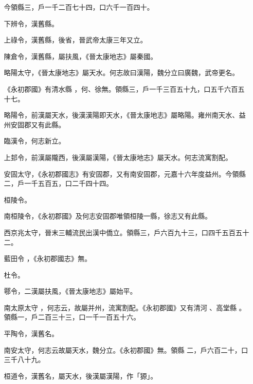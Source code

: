 \begin{pinyinscope}
 今領縣三，戶一千二百七十四，口六千一百四十。



 下辨令，漢舊縣。



 上祿令，漢舊縣，後省，晉武帝太康三年又立。



 陳倉令，漢舊縣，屬扶風，《晉太康地志》屬秦國。



 略陽太守，《晉太康地志》屬天水。何志故曰漢陽，魏分立曰廣魏，武帝更名。


《永初郡國》有清水縣
 ，何、徐無。領縣三，戶一千三百五十九，口五千六百五十七。



 略陽令，前漢屬天水，後漢漢陽即天水，《晉太康地志》屬略陽。雍州南天水、益州安固郡又有此縣。



 臨漢令，何志新立。



 上邽令，前漢屬隴西，後漢屬漢陽，《晉太康地志》屬天水。何志流寓割配。



 安固太守，《永初郡國志》有安固郡，又有南安固郡，元嘉十六年度益州。今領縣二，戶一千五百五，口二千四十四。


桓陵令。



 南桓陵令，《永初郡國》及何志安固郡唯領桓陵一縣，徐志又有此縣。



 西京兆太守，晉末三輔流民出漢中僑立。領縣三，戶六百九十三，口四千五百五十二。


藍田令
 ，《永初郡國志》無。


杜令。



 鄠令，二漢屬扶風，《晉太康地志》屬始平。


南太原太守
 ，何志云，故屬并州，流寓割配。《永初郡國》又有清河
 、高堂縣
 。領縣一，戶二百三十三，口一千一百五十六。



 平陶令，漢舊名。



 南安太守，何志云故屬天水，魏分立。《永初郡國》無。領縣
 二，戶六百二十，口三千八十九。



 桓道令，漢舊名，屬天水，後漢屬漢陽，作「獂」。




\end{pinyinscope}
